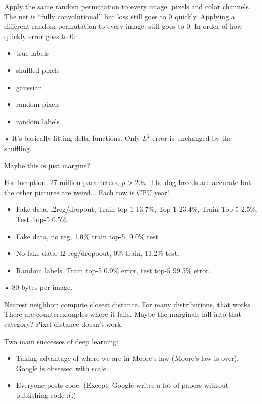 Apply the same random permutation to every image: pixels and color channels. The net is ``fully convolutional'' but loss still goes to 0 quickly. Applying a different random permutation to every image: still goes to 0.
In order of how quickly error goes to 0:
\begin{itemize}
\item
true labels
\item
shuffled pixels
\item
gaussian
\item
random pixels
\item
random labels
\end{itemize}•
It's basically fitting delta functions. Only $L^2$ error is unchanged by the shuffling.

Maybe this is just margins?

For Inception, 27 million parameters, $p>20n$. The dog breeds are accurate but the other pictures are weird...
Each row is CPU year!
\begin{itemize}
\item
Fake data, l2reg/dropout, Train top-1 13.7\%, Top-1 23.4\%, Train Top-5 2.5\%, Test Top-5 6.5\%.
%
\item
Fake data, no reg, 1.0\% train top-5, 9.0\% test
\item
No fake data, l2 reg/dropoout, 0\% train, 11.2\% test.
\item
Random labels. Train top-5 0.9\% error, test top-5 99.5\% error.
\end{itemize}•
80 bytes per image.

Nearest neighbor: compute closest distance. For many distributions, that works. There are counterexamples where it fails. Maybe the marginals fall into that  category?
Pixel distance doesn't work.



Two main successes of deep learning:
\begin{itemize}
\item
Taking advantage of where we are in Moore's law (Moore's law is over). Google is obsessed with scale. 
\item
Everyone posts code. (Except: Google writes a lot of papers without publishing code :(.)
\end{itemize}

